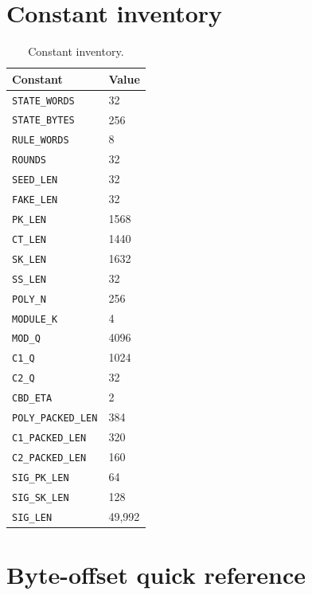 \documentclass[11pt,a4paper]{article}
\theoremstyle{plain}
\theoremstyle{definition}
\theoremstyle{remark}
\begin{document}
\appendix
\section{Constant inventory}
\label{app:constants}

\begin{longtable}{@{}ll@{}}
\caption{Constant inventory.}\\
\toprule
Constant & Value \\
\midrule
\endhead
\texttt{STATE\_WORDS} & 32 \\
\texttt{STATE\_BYTES} & 256 \\
\texttt{RULE\_WORDS} & 8 \\
\texttt{ROUNDS} & 32 \\
\texttt{SEED\_LEN} & 32 \\
\texttt{FAKE\_LEN} & 32 \\
\texttt{PK\_LEN} & 1568 \\
\texttt{CT\_LEN} & 1440 \\
\texttt{SK\_LEN} & 1632 \\
\texttt{SS\_LEN} & 32 \\
\texttt{POLY\_N} & 256 \\
\texttt{MODULE\_K} & 4 \\
\texttt{MOD\_Q} & 4096 \\
\texttt{C1\_Q} & 1024 \\
\texttt{C2\_Q} & 32 \\
\texttt{CBD\_ETA} & 2 \\
\texttt{POLY\_PACKED\_LEN} & 384 \\
\texttt{C1\_PACKED\_LEN} & 320 \\
\texttt{C2\_PACKED\_LEN} & 160 \\
\texttt{SIG\_PK\_LEN} & 64 \\
\texttt{SIG\_SK\_LEN} & 128 \\
\texttt{SIG\_LEN} & 49,992 \\
\bottomrule
\end{longtable}

\section{Byte-offset quick reference}
\label{app:offsets}
\end{document}
